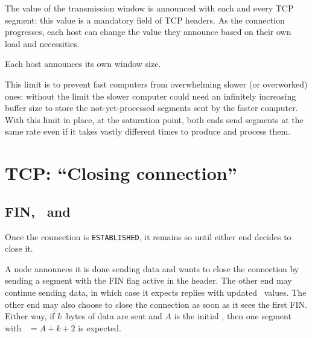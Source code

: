 The value of the transmission window is announced with each and every TCP segment:
this value is a mandatory field of TCP headers.
% 
As the connection progresses, each host can change the value they announce based on 
their own load and necessities.

\begin{remark}
Each host announces its own window size.
\end{remark}


This limit is to prevent fast computers from overwhelming slower (or overworked) ones: 
without the limit the slower computer could need an infinitely increasing buffer size to store the 
not-yet-processed segments sent by the faster computer. With this limit in place, 
at the saturation point, both ends send segments at the same rate even if it takes vastly 
different times to produce and process them.

\section{TCP: ``Closing connection''}\label{sec:layer4:tcp_closing}

\subsection{FIN, \nseq\ and \nack}\label{sec:layer4:tcp_closing:fin_nseq_and_nack}

Once the connection is \texttt{ESTABLISHED}, it remains so until either end decides to close 
it. 

A node announces it is done sending data and wants to close the connection by sending a 
segment with the FIN flag active in the header. The other end may continue
sending data, in which case it expects replies with updated \nack\ values. The other end 
may also choose to close the connection as soon as it sees the first FIN.
% 
Either way, 
if $k$~bytes of data are sent and $A$
is the initial \nseq, then one segment with \nack\ $= A+k+2$ is expected.

\begin{center}
\end{center}

